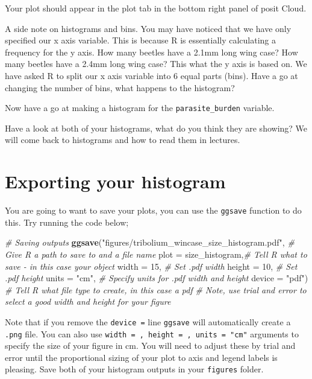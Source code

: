 \documentclass[
]{book}
\newenvironment{Shaded}{\begin{snugshade}}{\end{snugshade}}
\newcommand{\AttributeTok}[1]{\textcolor[rgb]{0.13,0.29,0.53}{#1}}
\newcommand{\CommentTok}[1]{\textcolor[rgb]{0.56,0.35,0.01}{\textit{#1}}}
\newcommand{\DecValTok}[1]{\textcolor[rgb]{0.00,0.00,0.81}{#1}}
\newcommand{\FunctionTok}[1]{\textcolor[rgb]{0.13,0.29,0.53}{\textbf{#1}}}
\newcommand{\NormalTok}[1]{#1}
\newcommand{\StringTok}[1]{\textcolor[rgb]{0.31,0.60,0.02}{#1}}
\begin{document}
Your plot should appear in the plot tab in the bottom right panel of posit Cloud.

A side note on histograms and bins. You may have noticed that we have only specified our x axis variable. This is because R is essentially calculating a frequency for the y axis. How many beetles have a 2.1mm long wing case? How many beetles have a 2.4mm long wing case? This what the y axis is based on. We have asked R to split our x axis variable into 6 equal parts (bins). Have a go at changing the number of bins, what happens to the histogram?

Now have a go at making a histogram for the \texttt{parasite\_burden} variable.

Have a look at both of your histograms, what do you think they are showing? We will come back to histograms and how to read them in lectures.

\section{Exporting your histogram}\label{export}

You are going to want to save your plots, you can use the \texttt{ggsave} function to do this. Try running the code below;

\begin{Shaded}
\begin{Highlighting}[]
\CommentTok{\# Saving outputs}
\FunctionTok{ggsave}\NormalTok{(}\StringTok{"figures/tribolium\_wincase\_size\_histogram.pdf"}\NormalTok{, }\CommentTok{\# Give R a path to save to and a file name}
       \AttributeTok{plot =}\NormalTok{ size\_histogram,}\CommentTok{\# Tell R what to save {-} in this case your object}
       \AttributeTok{width =} \DecValTok{15}\NormalTok{, }\CommentTok{\# Set .pdf width}
       \AttributeTok{height =} \DecValTok{10}\NormalTok{, }\CommentTok{\# Set .pdf height}
       \AttributeTok{units =} \StringTok{"cm"}\NormalTok{, }\CommentTok{\# Specify units for .pdf width and height}
       \AttributeTok{device =} \StringTok{"pdf"}\NormalTok{) }\CommentTok{\# Tell R what file type to create, in this case a pdf}
\CommentTok{\# Note, use trial and error to select a good width and height for your figure}
\end{Highlighting}
\end{Shaded}

Note that if you remove the \texttt{device\ =} line \texttt{ggsave} will automatically create a \texttt{.png} file. You can also use \texttt{width\ =\ ,\ height\ =\ ,\ units\ =\ "cm"} arguments to specify the size of your figure in cm. You will need to adjust these by trial and error until the proportional sizing of your plot to axis and legend labels is pleasing. Save both of your histogram outputs in your \texttt{figures} folder.
\end{document}
